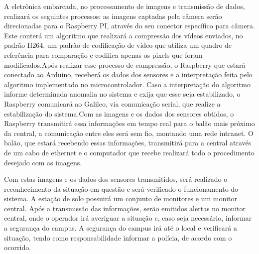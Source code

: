 A eletrônica embarcada, no processamento de imagens e transmissão de dados, realizará os seguintes processos: as imagens captadas pela câmera serão direcionadas para o Raspberry PI, através do seu conector específico para câmera. Este  conterá um algoritmo que realizará a compressão dos vídeos enviados, no padrão H264, um padrão de codificação de vídeo que utiliza um quadro de referência para comparação e codifica apenas os pixels que foram modificados.Após realizar esse processo de compressão, o Raspberry que estará conectado ao Arduino, receberá os dados dos sensores e a interpretação feita pelo algoritmo implementado no microcontrolador. Caso a interpretação do algoritmo informe determinada anomalia no sistema e exija que esse seja estabilizado, o Raspberry comunicará ao Galileo, via comunicação serial, que realize a estabilização do sistema.Com as imagens e os dados dos sensores obtidos, o Raspberry transmitirá essa informações em tempo real para o balão mais próximo da central, a comunicação entre eles será sem fio, montando uma rede intranet. O balão, que estará recebendo essas informações, transmitirá para a central através de um cabo de ethernet e o computador que recebe realizará todo o procedimento desejado com as imagens.

Com estas imagens e os dados dos sensores transmitidos, será realizado o reconhecimento da situação em questão e será verificado o funcionamento do sistema. A estação de solo possuirá um conjunto de monitores e um monitor central. Após a transmissão das informações, serão emitidos alertas no monitor central, onde o operador irá averiguar a situação e, caso seja necessário, informar a segurança do campus. A segurança do campus irá até o local e verificará a situação, tendo como responsabilidade informar a polícia, de acordo com o ocorrido.
